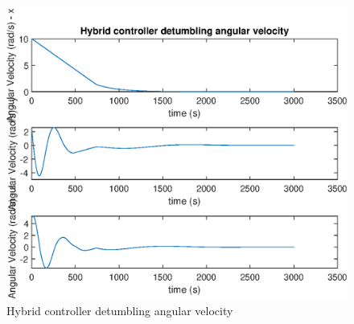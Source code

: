 \begin{figure}[H]
	\centering
	\includegraphics[width=0.7\linewidth]{figures/detumbling3}
	\caption{Hybrid controller detumbling angular velocity}
	\label{fig:omega}
\end{figure}

